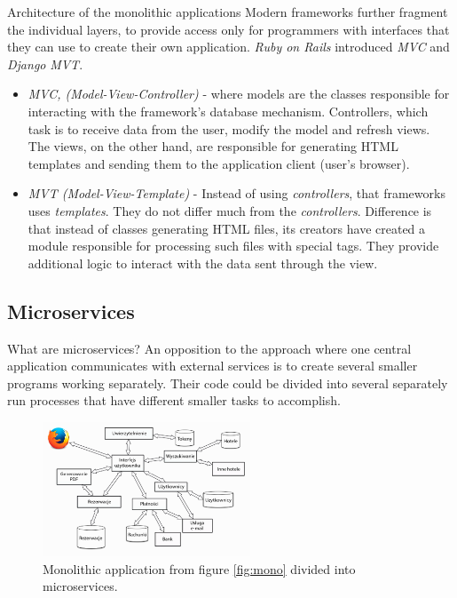 \documentclass{beamer}
\begin{document}
	\begin{frame}{Architecture of the monolithic applications}
		Modern frameworks further fragment the individual layers, to provide access only for programmers with interfaces that they can use to create their own application. \textit{Ruby on Rails} introduced \textit{MVC} and \textit{Django} \textit{MVT}.
		
		\begin{itemize}
  		\item \textit{MVC, (Model-View-Controller)} - where models are the classes responsible for interacting with the framework's database mechanism. Controllers, which task is to receive data from the user, modify the model and refresh views. The views, on the other hand, are responsible for generating HTML templates and sending them to the application client (user's browser).
  		\item \textit{MVT (Model-View-Template)} - Instead of using \textit{controllers}, that frameworks uses \textit{templates}. They do not differ much from the \textit{controllers}. Difference is that instead of classes generating HTML files, its creators have created a module responsible for processing such files with special tags. They provide additional logic to interact with the data sent through the view.
		\end{itemize}
	\end{frame}
	
	\subsection{Microservices}
	\begin{frame}{What are microservices?}
	An opposition to the approach where one central application communicates with external services is to create several smaller programs working separately. Their code could be divided into several separately run processes that have different smaller tasks to accomplish.
	
		\begin{figure}[h!]
			\centering
			\includegraphics[height=4cm]{Pictures/mikrouslugi}
			\caption{Monolithic application from figure \ref{fig:mono} divided into microservices.}	
			\label{fig:architekturaTroj}
		\end{figure}
	\end{frame}
	
\end{document}
